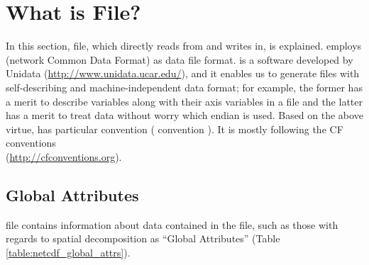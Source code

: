 \section{What is \scalenetcdf File?} \label{sec:netcdf}

In this section, \scalenetcdf file, which \scalelib directly reads from and writes in, is explained.
\scalelib employs \netcdf (network Common Data Format) as data file format.
\Netcdf is a software developed by Unidata (\url{http://www.unidata.ucar.edu/}),
and it enables us to generate files with self-describing and machine-independent data format;
for example, the former has a merit to describe variables along with their axis variables in a file and
the latter has a merit to treat data without worry which endian is used.
Based on the above virtue, \scalelib has particular convention ( \scalenetcdf convention ).
It is mostly following the CF conventions \\ (\url{http://cfconventions.org}).


\subsection{Global Attributes} \label{sec:global_attr}
\scalenetcdf file contains information about data contained in the file,
such as those with regards to spatial decomposition as ``Global Attributes'' (Table \ref{table:netcdf_global_attrs}).

